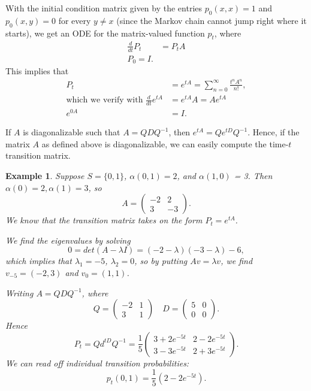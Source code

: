 \documentclass{tufte-handout}
\newtheorem{ex}[thm]{Example}
\theoremstyle{definition}
\begin{document}
With the initial condition matrix given by the entries $p_0(x,x) = 1$ and $p_0(x,y) = 0$ for every $y \ne x$ (since the Markov chain cannot jump right where it starts), we get an ODE for the matrix-valued function $p_t$, where 
\begin{align*}
	\frac{d}{dt} P_t &= P_t A \\
	P_0 = I
.\end{align*}
This implies that 
\begin{align*}
	P_t &= e^{t A} = \sum\limits_{n=0}^{\infty} \frac{t^n A^n}{n!}, \\
	\text{which we verify with } \frac{d}{dt} e^{tA} &= e^{tA} A = A e^{tA} \\
	e^{0 A} &= I
.\end{align*}

If $A$ is diagonalizable such that $A = QDQ^{-1}$, then $e^{tA} = Q e^{t D} Q^{-1}$. Hence, if the matrix $A$ as defined above is diagonalizable, we can easily compute the time-$t$ transition matrix.

\begin{ex}
	Suppose $S = \{0,1\}$, $\alpha(0,1) = 2$, and $\alpha(1,0)$ = 3. Then $\alpha(0) = 2, \alpha(1) = 3$, so \[
		A = \begin{pmatrix}
		-2 & 2 \\
		3 & -3
		\end{pmatrix} 
	.\] We know that the transition matrix takes on the form $P_t = e^{tA}$. 
	
	We find the eigenvalues by solving \[
		0 = det(A - \lambda I) = (-2-\lambda)(-3-\lambda) - 6
	,\] which implies that $\lambda_1 = -5$, $\lambda_2 = 0$, so by putting $Av = \lambda v$, we find $v_{-5} = (-2,3)$ and $v_0 = (1,1)$.

	Writing $A = QDQ^{-1}$, where \[
		Q = \begin{pmatrix}
		-2 & 1 \\
		3 & 1
		\end{pmatrix} \quad D = \begin{pmatrix}
		5 & 0 \\
		0 & 0
		\end{pmatrix} 
	.\] 
	Hence \[
		P_t = Qd^{t D} Q^{-1} = \frac{1}{5} \begin{pmatrix}
		    3+2e^{-5 t} & 2-2e^{-5 t} \\
			3-3e^{-5t} & 2+3e^{-5t}
		\end{pmatrix} 
	.\] 
	We can read off individual transition probabilities: \[
		p_t(0,1) = \frac{1}{5} \left( 2-2e^{-5t} \right)
	.\] 
\end{ex}
\end{document}
